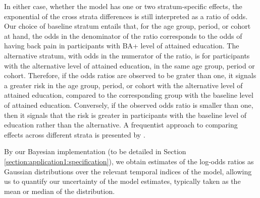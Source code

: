In either case, whether the model has one or two stratum-specific effects, the exponential of the cross strata differences is still interpreted as a ratio of odds. Our choice of baseline stratum entails that, for the age group, period, or cohort at hand, the odds in the denominator of the ratio corresponds to the odds of having back pain in participants with BA+ level of attained education. The alternative stratum, with odds in the numerator of the ratio, is for participants with the alternative level of attained education, in the same age group, period or cohort. Therefore, if the odds ratios are observed to be grater than one, it signals a greater risk in the age group, period, or cohort with the alternative level of attained education, compared to the corresponding group with the baseline level of attained education. Conversely, if the observed odds ratio is smaller than one, then it signals that the risk is greater in participants with the baseline level of education rather than the alternative. A frequentist approach to comparing effects across different strata is presented by \cite{Rosenberg2023}.

By our Bayesian implementation (to be detailed in Section \ref{section:application1:specification}), we obtain estimates of the log-odds ratios as Gaussian distributions over the relevant temporal indices of the model, allowing us to quantify our uncertainty of the model estimates, typically taken as the mean or median of the distribution.





